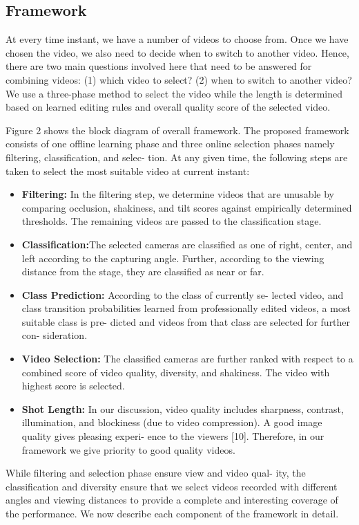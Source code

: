 \documentclass{sig-alternate-05-2015}
\begin{document}
\subsection{Framework}
At every time instant, we have a number of videos to choose
from. Once we have chosen the video, we also need to decide when
to switch to another video. Hence, there are two main questions
involved here that need to be answered for combining videos: (1)
which video to select? (2) when to switch to another video? We
use a three-phase method to select the video while the length is
determined based on learned editing rules and overall quality score
of the selected video.

Figure 2 shows the block diagram of overall framework. The
proposed framework consists of one offline learning phase and three online selection phases namely filtering, classification, and selec-
tion. At any given time, the following steps are taken to select the
most suitable video at current instant:\\
\begin{itemize}
\item \textbf{Filtering:} In the filtering step, we determine videos that are
unusable by comparing occlusion, shakiness, and tilt scores
against empirically determined thresholds. The remaining
videos are passed to the classification stage.
\item \textbf{Classification:}The selected cameras are classified as one
of right, center, and left according to the capturing angle.
Further, according to the viewing distance from the stage,
they are classified as near or far.
\item \textbf{Class Prediction:} According to the class of currently se-
lected video, and class transition probabilities learned from
professionally edited videos, a most suitable class is pre-
dicted and videos from that class are selected for further con-
sideration.
\item \textbf{Video Selection:} The classified cameras are further ranked
with respect to a combined score of video quality, diversity,
and shakiness. The video with highest score is selected.
\item \textbf{Shot Length:} In our discussion, video quality includes
sharpness, contrast, illumination, and blockiness (due to video
compression). A good image quality gives pleasing experi-
ence to the viewers [10]. Therefore, in our framework we
give priority to good quality videos.
\end{itemize}
While filtering and selection phase ensure view and video qual-
ity, the classification and diversity ensure that we select videos
recorded with different angles and viewing distances to provide a
complete and interesting coverage of the performance. We now
describe each component of the framework in detail.
\end{document}
